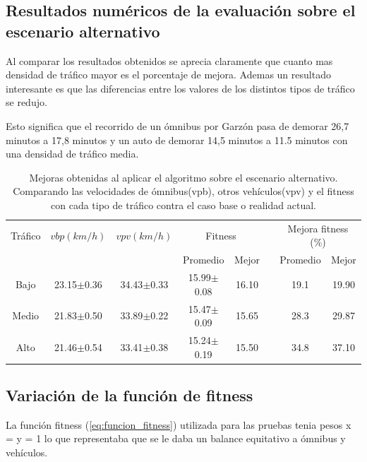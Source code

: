 \subsection{Resultados numéricos de la evaluación sobre el escenario alternativo}

Al comparar los resultados obtenidos se aprecia claramente que cuanto mas densidad de tráfico mayor es el porcentaje de mejora. Ademas un resultado interesante es que las diferencias entre los valores de los distintos tipos de tráfico se redujo.

Esto significa que el recorrido de un ómnibus por Garzón pasa de demorar 26,7 minutos a 17,8 minutos y un auto de demorar 14,5 minutos a 11.5 minutos con una densidad de tráfico media. 



\begin{table}[h]
	\renewcommand{\arraystretch}{1.2}
	\caption{Mejoras obtenidas al aplicar el algoritmo sobre el escenario alternativo. Comparando las velocidades de ómnibus(vpb), otros vehículos(vpv) y el fitness con cada tipo de tráfico contra el caso base o realidad actual.}
	\label{table:mejoras_trafico_alternativo_algoritmo}
	\centering
	\begin{tabular}{cccccccc}
		\hline 
		Tráfico& 
		$vbp(km/h)$& 
		$vpv(km/h)$&
		\multicolumn{2}{c}{Fitness}&  & 
		\multicolumn{2}{c}{Mejora fitness (\%)}\\  \cline{4-5} \cline{7-8}&     &     & \multicolumn{1}{c}{Promedio} & \multicolumn{1}{c}{Mejor} &  & \multicolumn{1}{c}{Promedio} & \multicolumn{1}{c}{Mejor} \\ \hline

		Bajo & 23.15$\pm$0.36 & 34.43$\pm$0.33 & 15.99$\pm$0.08 & 16.10 & & 19.1& 19.90 \\
		Medio & 21.83$\pm$0.50  & 33.89$\pm$0.22 & 15.47$\pm$0.09& 15.65 & & 28.3 & 29.87\\
		Alto & 21.46$\pm$0.54  & 33.41$\pm$0.38 & 15.24$\pm$0.19& 15.50 & & 34.8 & 37.10\\			    
	\end{tabular}
\end{table}


\subsection{Variación de la función de fitness}

La función fitness (\ref{eq:funcion_fitness}) utilizada para las pruebas tenia pesos x = y = 1 lo que representaba que se le daba un balance equitativo a ómnibus y vehículos.

